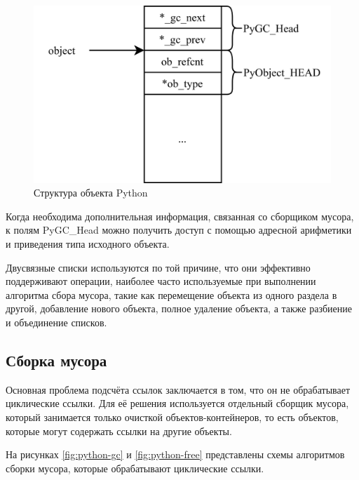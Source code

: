 \begin{figure}[H]
	\centering
	\includegraphics[scale=0.27]{assets/python-object.png}
	\caption{Структура объекта Python}
	\label{fig:pyobject}
\end{figure}

Когда необходима дополнительная информация, связанная со сборщиком мусора, к полям PyGC\_Head можно получить доступ с помощью адресной арифметики и приведения типа исходного объекта. \cite{python_gc}

Двусвязные списки используются по той причине, что они эффективно поддерживают операции, наиболее часто используемые при выполнении алгоритма сбора мусора, такие как перемещение объекта из одного раздела в другой, добавление нового объекта, полное удаление объекта, а также разбиение и объединение списков. \cite{python_gc}



\subsection{Сборка мусора}

Основная проблема подсчёта ссылок заключается в том, что он не обрабатывает циклические ссылки. Для её решения используется отдельный сборщик мусора, который занимается только очисткой объектов-контейнеров, то есть объектов, которые могут содержать ссылки на другие объекты. \cite{python_gc}

На рисунках \ref{fig:python-gc} и \ref{fig:python-free} представлены схемы алгоритмов сборки мусора, которые обрабатывают циклические ссылки. \cite{python_gc}

